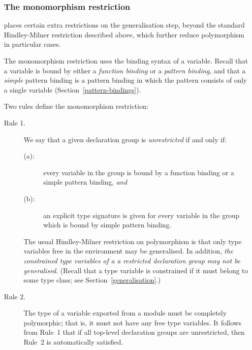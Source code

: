 \subsubsection{The monomorphism restriction}
\label{sect:monomorphism-restriction}

\Haskell{} places certain extra restrictions on the generalisation
step, beyond the standard Hindley-Milner restriction described above,
which further reduce polymorphism in particular cases.

The monomorphism restriction uses the binding syntax of a
variable.  Recall that a variable is bound by either a {\em function
binding} or a {\em pattern binding}, and that a {\em simple} pattern
binding is a pattern binding in which the pattern consists of only a
single variable (Section~\ref{pattern-bindings}).

Two rules define the monomorphism restriction:
\begin{description}
\item[Rule 1.]
We say that a given declaration group is {\em unrestricted} if and only if:
\begin{description}
\item[(a):]
every variable in the group is bound by a function binding or a simple
pattern binding, {\em and}
\item[(b):]
an explicit type signature is given for every variable in the group
which is bound by simple pattern binding.
\end{description}
The usual Hindley-Milner restriction on polymorphism is that
only type variables free in the environment may be generalised.
In addition, {\em the constrained type variables of a
a restricted declaration group may not be generalised}.
(Recall that a type variable is constrained if it must belong
to some type class; see Section~\ref{generalisation}.)
% 

\item[Rule 2.]
The type of a variable exported from a module must be completely polymorphic;
that is, it must not have any free type variables.
It follows from Rule~1 that if all top-level declaration groups are
unrestricted, then Rule~2 is automatically satisfied.
\end{description}

